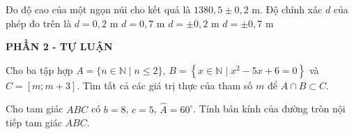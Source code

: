 \begin{ex}%
Đo độ cao của một ngọn núi cho kết quả là $1380{,}5 \pm 0{,}2 $ m. Độ chính xác $d$ của phép đo trên là
\choice
{\True $d=0{,}2$ m}
{ $d=0{,}7$ m}
{ $d= \pm 0{,}2$ m}
{ $d= \pm 0{,}7$ m}
\end{ex}



\begin{center}
	\textbf{PHẦN 2 - TỰ LUẬN}
\end{center}






\begin{bt}%
	Cho ba tập hợp $A=\{n \in \mathbb{N}\mid n \leq 2\}$, $B=\left\{x \in \mathbb{N}\mid x^2-5 x+6=0\right\}$ và $C=[m; m+3]$. Tìm tất cả các giá trị thực của tham số $m$ để $A \cap B \subset C$.
\end{bt}

\begin{bt}%
	Cho tam giác $ABC$ có $b=8$, $c=5$, $\widehat{A}=60^{\circ}$. Tính bán kính của đường tròn nội tiếp tam giác $A B C$.
\end{bt}

